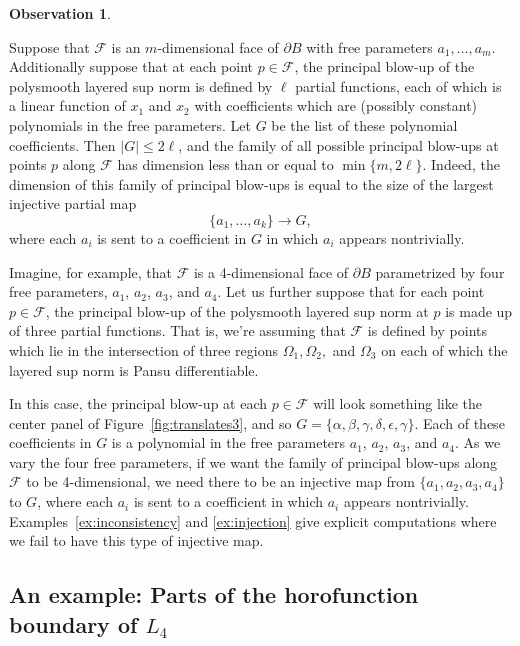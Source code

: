 \documentclass{article}
\theoremstyle{definition}
\newtheorem{observation}[theorem]{Observation}
\newcommand{\cF}{{\mathcal F}}
\begin{document}
\begin{observation} \label{obs:injection}

Suppose that $\cF$ is an $m$-dimensional face of $\partial B$ with free parameters $a_1, \ldots, a_m$. Additionally suppose that at each point $p \in \cF$, the principal blow-up of the polysmooth layered sup norm is defined by $\ell$ partial functions, each of which is a linear function of $x_1$ and $x_2$ with coefficients which are (possibly constant) polynomials in the free parameters. Let $G$ be the list of these polynomial coefficients. Then $|G| \leq 2\ell$, and the family of all possible principal blow-ups at points $p$ along $\cF$ has dimension less than or equal to $\min\{m, 2\ell\}$. Indeed, the dimension of this family of principal blow-ups is equal to the size of the largest injective partial map
\[
\{a_1, \ldots, a_k\} \to G,
\]
where each $a_i$ is sent to a coefficient in $G$ in which $a_i$ appears nontrivially.

Imagine, for example, that $\cF$ is a 4-dimensional face of $\partial B$ parametrized by four free parameters, $a_{1}$, $a_{2}$, $a_{3}$, and $a_{4}$. Let us further suppose that for each point $p \in \cF$, the principal blow-up of the polysmooth layered sup norm at $p$ is made up of three partial functions. That is, we're assuming that $\cF$ is defined by points which lie in the intersection of three regions $\Omega_1, \Omega_2,$ and $\Omega_3$ on each of which the layered sup norm is Pansu differentiable.

In this case, the principal blow-up at each $p \in \cF$ will look something like the center panel of Figure~\ref{fig:translates3}, and so $G = \{\alpha, \beta, \gamma, \delta, \epsilon, \gamma\}$. Each of these coefficients in $G$ is a polynomial in the free parameters $a_{1}$, $a_{2}$, $a_{3}$, and $a_{4}$. As we vary the four free parameters, if we want the family of principal blow-ups along $\cF$ to be 4-dimensional, we need there to be an injective map from $\{a_{1}, a_{2}, a_{3}, a_{4}\}$ to $G$, where each $a_{i}$ is sent to a coefficient in which $a_{i}$ appears nontrivially. Examples~\ref{ex:inconsistency} and \ref{ex:injection} give explicit computations where we fail to have this type of injective map.
\end{observation}



\subsection{An example: Parts of the horofunction boundary of $L_4$}\label{sec-example}
\end{document}
